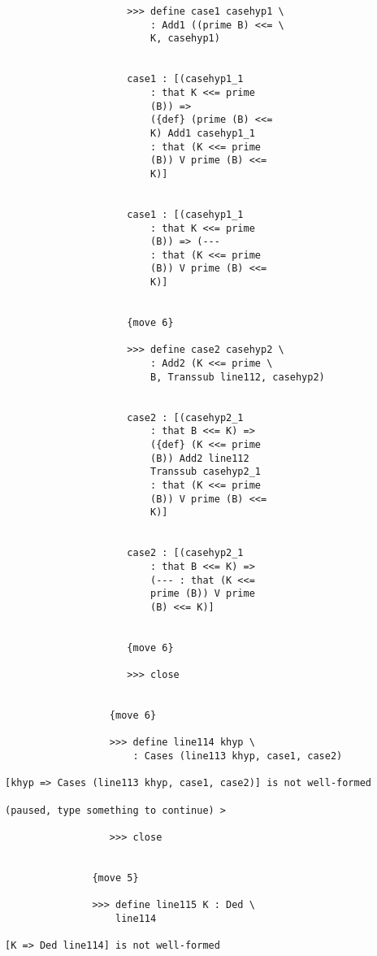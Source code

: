 \documentclass[12pt]{article}
\begin{document}
\begin{verbatim}
                     >>> define case1 casehyp1 \
                         : Add1 ((prime B) <<= \
                         K, casehyp1)


                     case1 : [(casehyp1_1 
                         : that K <<= prime 
                         (B)) => 
                         ({def} (prime (B) <<= 
                         K) Add1 casehyp1_1 
                         : that (K <<= prime 
                         (B)) V prime (B) <<= 
                         K)]


                     case1 : [(casehyp1_1 
                         : that K <<= prime 
                         (B)) => (--- 
                         : that (K <<= prime 
                         (B)) V prime (B) <<= 
                         K)]


                     {move 6}

                     >>> define case2 casehyp2 \
                         : Add2 (K <<= prime \
                         B, Transsub line112, casehyp2)


                     case2 : [(casehyp2_1 
                         : that B <<= K) => 
                         ({def} (K <<= prime 
                         (B)) Add2 line112 
                         Transsub casehyp2_1 
                         : that (K <<= prime 
                         (B)) V prime (B) <<= 
                         K)]


                     case2 : [(casehyp2_1 
                         : that B <<= K) => 
                         (--- : that (K <<= 
                         prime (B)) V prime 
                         (B) <<= K)]


                     {move 6}

                     >>> close


                  {move 6}

                  >>> define line114 khyp \
                      : Cases (line113 khyp, case1, case2)

[khyp => Cases (line113 khyp, case1, case2)] is not well-formed

(paused, type something to continue) >

                  >>> close


               {move 5}

               >>> define line115 K : Ded \
                   line114

[K => Ded line114] is not well-formed


\end{verbatim}
\end{document}
